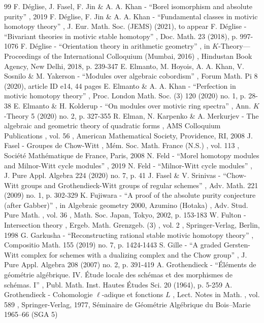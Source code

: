 \documentclass[11pt]{article}
\numberwithin{equation}{section}\renewcommand{\encodingdefault}{TU}
\begin{document}
\begin{thebibliography}{99}
 F. Déglise, J. Fasel, F. Jin \& A. A. Khan - “Borel isomorphism and absolute purity” , 2019
 F. Déglise, F. Jin \& A. A. Khan - “Fundamental classes in motivic homotopy theory” , J. Eur. Math. Soc. (JEMS) (2021), to appear
 F. Déglise - “Bivariant theories in motivic stable homotopy” , Doc. Math. 23 (2018), p. 997-1076
 F. Déglise - “Orientation theory in arithmetic geometry” , in $K$-Theory—Proceedings of the International Colloquium (Mumbai, 2016) , Hindustan Book Agency, New Delhi, 2018, p. 239-347
 E. Elmanto, M. Hoyois, A. A. Khan, V. Sosnilo \& M. Yakerson - “Modules over algebraic cobordism” , Forum Math. Pi 8 (2020), article ID e14, 44 pages
 E. Elmanto \& A. A. Khan - “Perfection in motivic homotopy theory” , Proc. London Math. Soc. (3) 120 (2020) no. 1, p. 28-38
 E. Elmanto \& H. Kolderup - “On modules over motivic ring spectra” , Ann. $K$-Theory 5 (2020) no. 2, p. 327-355
 R. Elman, N. Karpenko \& A. Merkurjev - The algebraic and geometric theory of quadratic forms , AMS Colloquium Publications , vol. 56 , American Mathematical Society, Providence, RI, 2008
 J. Fasel - Groupes de Chow-Witt , Mém. Soc. Math. France (N.S.) , vol. 113 , Société Mathématique de France, Paris, 2008
 N. Feld - “Morel homotopy modules and Milnor-Witt cycle modules” , 2019
 N. Feld - “Milnor-Witt cycle modules” , J. Pure Appl. Algebra 224 (2020) no. 7, p. 41
 J. Fasel \& V. Srinivas - “Chow-Witt groups and Grothendieck-Witt groups of regular schemes” , Adv. Math. 221 (2009) no. 1, p. 302-329
 K. Fujiwara - “A proof of the absolute purity conjecture (after Gabber)” , in Algebraic geometry 2000, Azumino (Hotaka) , Adv. Stud. Pure Math. , vol. 36 , Math. Soc. Japan, Tokyo, 2002, p. 153-183
 W. Fulton - Intersection theory , Ergeb. Math. Grenzgeb. (3) , vol. 2 , Springer-Verlag, Berlin, 1998
 G. Garkusha - “Reconstructing rational stable motivic homotopy theory” , Compositio Math. 155 (2019) no. 7, p. 1424-1443
 S. Gille - “A graded Gersten-Witt complex for schemes with a dualizing complex and the Chow group” , J. Pure Appl. Algebra 208 (2007) no. 2, p. 391-419
 A. Grothendieck - “Éléments de géométrie algébrique. IV. Étude locale des schémas et des morphismes de schémas. I” , Publ. Math. Inst. Hautes Études Sci. 20 (1964), p. 5-259
 A. Grothendieck - Cohomologie $\ell $-adique et fonctions ${L}$ , Lect. Notes in Math. , vol. 589 , Springer-Verlag, 1977, Séminaire de Géométrie Algébrique du Bois–Marie 1965–66 (SGA 5)

\end{thebibliography}
\end{document}
